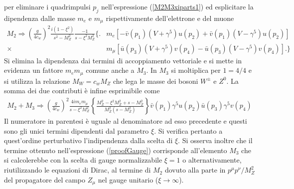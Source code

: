 \documentclass[11pt]{article}
\begin{document}
    per eliminare i quadrimpulsi $p_j$ nell'espressione (\ref{M2M3xiparts1}) ed esplicitare la dipendenza dalle masse $m_e$ e $m_\mu$ rispettivamente dell'elettrone e del muone
    \begin{equation}
    \begin{split}
    M_2\Rightarrow\left(\frac{g}{4c_w}\right)^2 \frac{i(1-\xi^2)}{s^2-M_Z^2}\frac{-1}{s-\xi^2 M_Z^2}\Big\{ \Big.&m_e[-\bar{v}(p_1)(V+\gamma^5)u(p_2)+\bar{v}(p_1)(V-\gamma^5)u(p_2)] \\
    \times &m_\mu[\bar{u}(p_3)(V+\gamma^5)v(p_4)-\bar{u}(p_3)(V-\gamma^5)v(p_4)]\Big. \Big\}
    \end{split}
    \end{equation}
    Si elimina la dipendenza dai termini di accoppiamento vettoriale e si mette in evidenza un fattore $m_em_\mu$ comune anche a $M_3$. In $M_3$ si moltiplica per $1=4/4$ e si utilizza la relazione $M_W=c_wM_Z$ che lega le masse dei bosoni $W^\pm$ e $Z^0$. La somma dei due contributi è infine
    esprimibile come
    \begin{equation}\label{proofGauge}
    \begin{split}
    M_2+M_3\Rightarrow\left(\frac{g}{4c_w}\right)^2\frac{4im_e m_\mu}{s-\xi^2M_Z^2}\left\{\frac{M_Z^2-\xi^2M_Z^2+s-M_Z^2}{M_Z^2(s-M_Z^2)}\right\}\bar{v}(p_1)\gamma^5u(p_2)\bar{u}(p_3)\gamma^5v(p_4)
    \end{split}
    \end{equation}
    Il numeratore in parentesi è uguale al denominatore ad esso precedente e questi sono gli unici termini dipendenti dal parametro $\xi$. Si verifica pertanto a quest'ordine perturbativo l'indipendenza dalla scelta di $\xi$. Si osserva inoltre che
    il termine ottenuto nell'espressione (\ref{proofGauge}) corrisponde all'elemento $M_3$ che si calcolerebbe con la scelta di gauge normalizzabile $\xi=1$ o alternativamente, riutilizzando le equazioni di Dirac, al termine di $M_2$ dovuto alla parte in
    $p^\mu p^\nu/M_Z^2$ del propagatore del campo $Z_\mu$ nel gauge unitario ($\xi\to\infty$).
\end{document}
